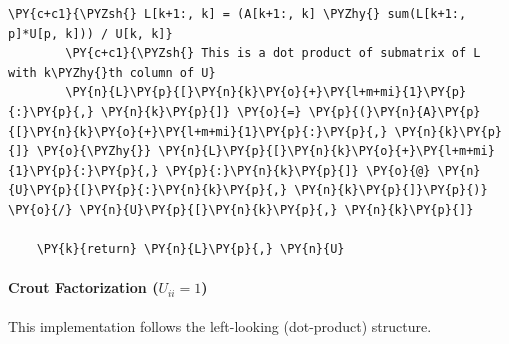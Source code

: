 \begin{Verbatim}[commandchars=\\\{\}]
        \PY{c+c1}{\PYZsh{} L[k+1:, k] = (A[k+1:, k] \PYZhy{} sum(L[k+1:, p]*U[p, k])) / U[k, k]}
        \PY{c+c1}{\PYZsh{} This is a dot product of submatrix of L with k\PYZhy{}th column of U}
        \PY{n}{L}\PY{p}{[}\PY{n}{k}\PY{o}{+}\PY{l+m+mi}{1}\PY{p}{:}\PY{p}{,} \PY{n}{k}\PY{p}{]} \PY{o}{=} \PY{p}{(}\PY{n}{A}\PY{p}{[}\PY{n}{k}\PY{o}{+}\PY{l+m+mi}{1}\PY{p}{:}\PY{p}{,} \PY{n}{k}\PY{p}{]} \PY{o}{\PYZhy{}} \PY{n}{L}\PY{p}{[}\PY{n}{k}\PY{o}{+}\PY{l+m+mi}{1}\PY{p}{:}\PY{p}{,} \PY{p}{:}\PY{n}{k}\PY{p}{]} \PY{o}{@} \PY{n}{U}\PY{p}{[}\PY{p}{:}\PY{n}{k}\PY{p}{,} \PY{n}{k}\PY{p}{]}\PY{p}{)} \PY{o}{/} \PY{n}{U}\PY{p}{[}\PY{n}{k}\PY{p}{,} \PY{n}{k}\PY{p}{]}

    \PY{k}{return} \PY{n}{L}\PY{p}{,} \PY{n}{U}
\end{Verbatim}

\paragraph{Crout Factorization ($U_{ii} = 1$)}
This implementation follows the left-looking (dot-product) structure.

